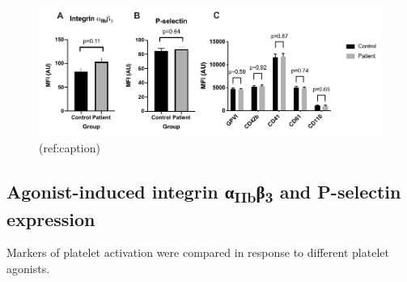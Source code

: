 \documentclass[11pt,twoside]{bristolthesis}
\begin{document}
\begin{figure}
\includegraphics{figure/Bariatric_study/Basal_surface_receptors} \caption[(ref:scaption)]{(ref:caption)}\label{fig:basal-integrin-pselectin-receptor-bariatric}
\end{figure}
\hypertarget{agonist-induced-integrin-ux3b1iibux3b23-and-p-selectin-expression}{%
\subsection{\texorpdfstring{Agonist-induced integrin α\textsubscript{IIb}β\textsubscript{3} and P-selectin expression}{Agonist-induced integrin αIIbβ3 and P-selectin expression}}\label{agonist-induced-integrin-ux3b1iibux3b23-and-p-selectin-expression}}

Markers of platelet activation were compared in response to different platelet agonists.
\end{document}
